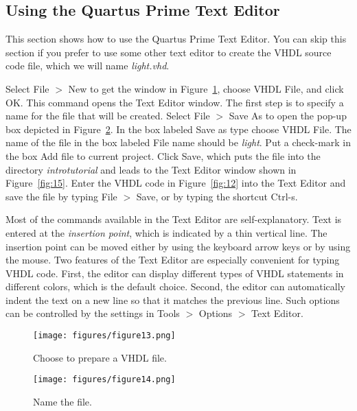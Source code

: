 \subsection{Using the Quartus Prime Text Editor}

\noindent 
This section shows how to use the Quartus Prime Text Editor.
You can skip this section if you prefer to use some other text editor
to create the VHDL source code file, which we will name {\it light.vhd}. 

Select {\sf File $>$ New} to get the window in Figure~\ref{fig:13}, 
choose {\sf VHDL File}, and click {\sf OK}. 
This command opens the Text Editor window.  The first step is to specify a name
for the file that will be created. Select {\sf File $>$ Save As}
to open the pop-up box depicted in Figure~\ref{fig:14}. 
In the box labeled {\sf Save as type} choose {\sf VHDL File}.
The name of the file in the box labeled {\sf File name} should be {\it light}.
Put a check-mark in the box {\sf Add file to current project}.
Click {\sf Save}, which puts the file into the directory
{\it introtutorial} and leads to the Text Editor window shown
in Figure~\ref{fig:15}. 
Enter the VHDL code in Figure~\ref{fig:12}
into the Text Editor and save the file by typing {\sf File $>$ Save}, or by typing 
the shortcut {\sf Ctrl-s}.

Most of the commands available in the Text Editor are self-explanatory. 
Text is entered at the {\it insertion point}, which is indicated by a thin
vertical line. The insertion point can be moved either by using the
keyboard arrow keys or by using the mouse. Two features of 
the Text Editor are especially convenient for typing VHDL
code. First, the editor can display different types of VHDL
statements in different colors, which is the default choice. 
Second, the editor can automatically
indent the text on a new line so that it matches the previous line. 
Such options can be controlled by the settings 
in {\sf Tools $>$ Options $>$ Text Editor}.

\begin{figure}[H]
   \begin{center}
      \texttt{[image: figures/figure13.png]}
   \caption{Choose to prepare a VHDL file.} 
	 \label{fig:13}
	 \end{center}
\end{figure}

\begin{figure}[H]
   \begin{center}
      \texttt{[image: figures/figure14.png]}
   \caption{Name the file.} 
	 \label{fig:14}
	 \end{center}
\end{figure}

